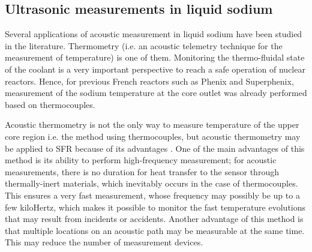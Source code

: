 
\subsection{Ultrasonic measurements in liquid sodium} \label{ssec:ac_prop}

    Several applications of acoustic measurement in liquid sodium have been studied in the literature.
    Thermometry (i.e. an acoustic telemetry technique for the measurement of temperature) is one of them. Monitoring the thermo-fluidal state of the coolant is
a very important perspective to reach a safe operation of nuclear reactors. Hence, for previous French reactors such as Phenix and Superphenix, measurement of
the sodium temperature at the core outlet was already performed based on thermocouples.

    Acoustic thermometry is not the only way to measure temperature of the upper core region i.e. the method using thermocouples, but acoustic thermometry may
be applied to SFR because of its advantages \parencite{Massacret2014Etudedunemethode}. One of the main advantages of this method is its ability to perform
high-frequency measurement; for acoustic measurements, there is no duration for heat transfer to the sensor through thermally-inert materials, which inevitably
occurs in the case of thermocouples. This ensures a very fast measurement, whose frequency may possibly be up to a few kiloHertz, which makes it possible to
monitor the fast temperature evolutions that may result from incidents or accidents. Another advantage of this method is that multiple locations on an acoustic
path may be measurable at the same time. This may reduce the number of measurement devices.

